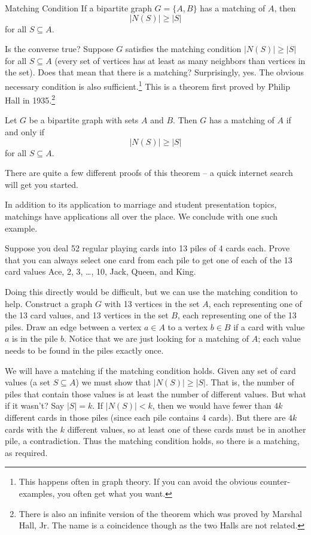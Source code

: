 \documentclass[12pt]{article}
\begin{document}
\begin{defbox}{Matching Condition}
If a bipartite graph $G = \{A, B\}$ has a matching of $A$, then
\[|N(S)| \ge |S|\]
for all $S \subseteq A$.
\end{defbox}

Is the converse true?  Suppose $G$ satisfies the matching condition $|N(S)| \ge |S|$ for all $S \subseteq A$ (every set of vertices has at least as many neighbors than vertices in the set).  Does that mean that there is a matching?  Surprisingly, yes.  The obvious necessary condition is also sufficient.\footnote{This happens often in graph theory.  If you can avoid the obvious counter-examples, you often get what you want.}  This is a theorem first proved by Philip Hall in 1935.\footnote{There is also an infinite version of the theorem which was proved by Marshal Hall, Jr.  The name is a coincidence though as the two Halls are not related.}

\begin{theorem}
Let $G$ be a bipartite graph with sets $A$ and $B$.  Then $G$ has a matching of $A$ if and only if
\[|N(S)| \ge |S|\]
for all $S \subseteq A$.
\end{theorem}

There are quite a few different proofs of this theorem -- a quick internet search will get you started.

In addition to its application to marriage and student presentation topics, matchings have applications all over the place.  We conclude with one such example.

\begin{example}
Suppose you deal 52 regular playing cards into 13 piles of 4 cards each.  Prove that you can always select one card from each pile to get one of each of the 13 card values Ace, 2, 3, \ldots, 10, Jack, Queen, and King.

\begin{solution}
	Doing this directly would be difficult, but we can use the matching condition to help.  Construct a graph $G$ with 13 vertices in the set $A$, each representing one of the 13 card values, and 13 vertices in the set $B$, each representing one of the 13 piles.  Draw an edge between a vertex $a \in A$ to a vertex $b \in B$ if a card with value $a$ is in the pile $b$.  Notice that we are just looking for a matching of $A$; each value needs to be found in the piles exactly once.

	We will have a matching if the matching condition holds.  Given any set of card values (a set $S \subseteq A$) we must show that $|N(S)| \ge |S|$.  That is, the number of piles that contain those values is at least the number of different values. But what if it wasn't?  Say $|S| = k$.  If $|N(S)| < k$, then we would have fewer than $4k$ different cards in those piles (since each pile contains 4 cards).  But there are $4k$ cards with the $k$ different values, so at least one of these cards must be in another pile, a contradiction.  Thus the matching condition holds, so there is a matching, as required.
\end{solution}

\end{example}
\end{document}
